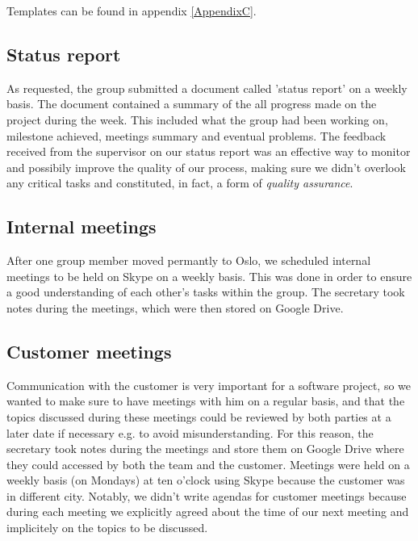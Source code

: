 Templates can be found in appendix \ref{AppendixC}.

\subsection{Status report}
As requested, the group submitted a document called 'status report' on a weekly basis.
The document contained a summary of the all progress made on the project during the week.
This included what the group had been working on, milestone achieved, meetings summary and eventual problems.
The feedback received from the supervisor on our status report was an effective way to monitor and possibily improve
the quality of our process, making sure we didn't overlook any critical tasks and constituted, in fact, a form of
\textit{quality assurance}.

\subsection{Internal meetings}
After one group member moved permantly to Oslo, we scheduled internal meetings to be held on Skype
on a weekly basis. This was done in order to ensure a good understanding of each other's tasks within the group.
The secretary took notes during the meetings, which were then stored on Google Drive.

\subsection{Customer meetings}
Communication with the customer is very important for a software project, so we wanted to make sure to have meetings
with him on a regular basis, and that the topics discussed during these meetings could be reviewed by
both parties at a later date if necessary e.g. to avoid misunderstanding.
For this reason, the secretary took notes during the meetings and store them on Google Drive where they
could accessed by both the team and the customer. Meetings were held on a weekly basis (on Mondays) at ten o'clock using
Skype because the customer was in different city.
Notably, we didn't write agendas for customer meetings because during each meeting we explicitly
agreed about the time of our next meeting and implicitely on the topics to be discussed.

